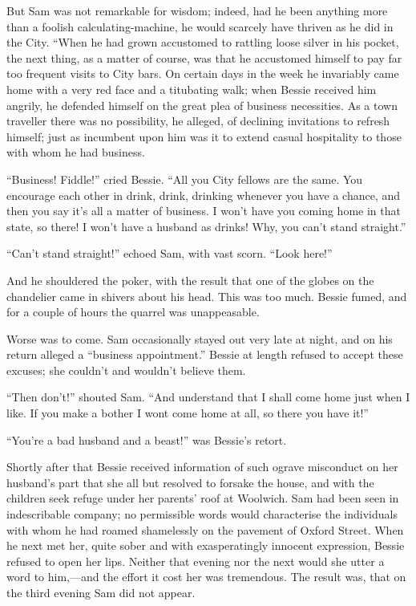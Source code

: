 But Sam was not remarkable for wisdom; indeed, had he been anything more
than a foolish calculating-machine, he would scarcely have thriven as he
did in the City. ``When he had grown accustomed to rattling loose silver
in his pocket, the next thing, as a matter of course, was that he
accustomed himself to pay far too frequent visits to City bars. On
certain days in the week he invariably came home with a very red face
and a titubating walk; when Bessie received him angrily, he defended
himself on the great plea of business {}necessities. As a town traveller
there was no possibility, he alleged, of declining invitations to
refresh himself; just as incumbent upon him was it to extend casual
hospitality to those with whom he had business.

``Business! Fiddle!'' cried Bessie. ``All you City fellows are the same.
You encourage each other in drink, drink, drinking whenever you have a
chance, and then you say it's all a matter of business. I won't have you
coming home in that state, so there! I won't have a husband as drinks!
Why, you can't stand straight.''

``Can't stand straight!'' echoed Sam, with vast scorn. ``Look here!''

And he shouldered the poker, with the result that one of the globes on
the chandelier came in shivers about his head. This was too much. Bessie
fumed, and for a couple of hours the quarrel was unappeasable.

Worse was to come. Sam occasionally stayed out very late at night, and
on his return alleged a ``business appointment.'' Bessie at length
refused to accept these excuses; she couldn't and wouldn't believe them.

``Then don't!'' shouted Sam. ``And understand that I shall come home
just when I like. {}If you make a bother I wont come home at all, so
there you have it!''

``You're a bad husband and a beast!'' was Bessie's retort.

Shortly after that Bessie received information of such ograve misconduct
on her husband's part that she all but resolved to forsake the house,
and with the children seek refuge under her parents' roof at Woolwich.
Sam had been seen in indescribable company; no permissible words would
characterise the individuals with whom he had roamed shamelessly on the
pavement of Oxford Street. When he next met her, quite sober and with
exasperatingly innocent expression, Bessie refused to open her lips.
Neither that evening nor the next would she utter a word to him,---and
the effort it cost her was tremendous. The result was, that on the third
evening Sam did not appear.

